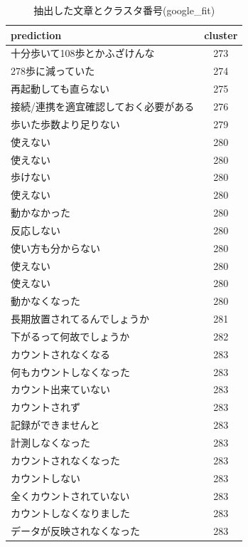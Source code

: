 \begin{table}[htbp]
  \caption{抽出した文章とクラスタ番号(google\_fit)}
  \label{tb:clustering}
  \begin{center}
  \begin{tabularx}{\linewidth}{|X|c|}
    \hline
    prediction&cluster\\\hline\hline
    十分歩いて108歩とかふざけんな&273\\\hline
    278歩に減っていた&274\\\hline
    再起動しても直らない&275\\\hline
    接続/連携を適宜確認しておく必要がある&276\\\hline
    歩いた歩数より足りない&279\\\hline
    使えない&280\\\hline
    使えない&280\\\hline
    歩けない&280\\\hline
    使えない&280\\\hline
    動かなかった&280\\\hline
    反応しない&280\\\hline
    使い方も分からない&280\\\hline
    使えない&280\\\hline
    使えない&280\\\hline
    動かなくなった&280\\\hline
    長期放置されてるんでしょうか&281\\\hline
    下がるって何故でしょうか&282\\\hline
    カウントされなくなる&283\\\hline
    何もカウントしなくなった&283\\\hline
    カウント出来ていない&283\\\hline
    カウントされず&283\\\hline
    記録ができませんと&283\\\hline
    計測しなくなった&283\\\hline
    カウントされなくなった&283\\\hline
    カウントしない&283\\\hline
    全くカウントされていない&283\\\hline
    カウントしなくなりました&283\\\hline
    データが反映されなくなった&283\\\hline
  \end{tabularx}\end{center}
\end{table}



